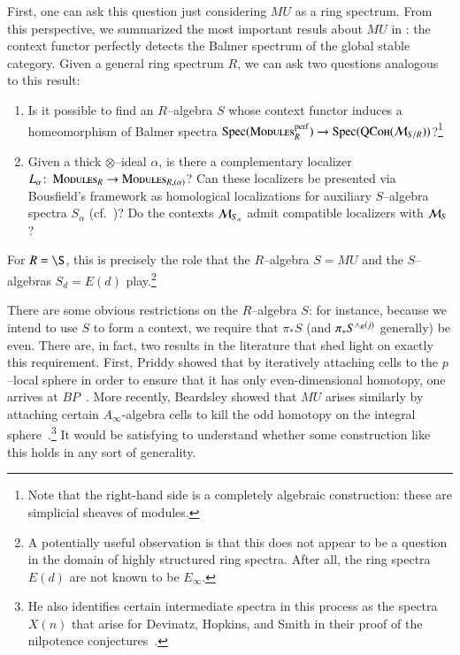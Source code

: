 First, one can ask this question just considering $MU$ as a ring spectrum.  From this perspective, we summarized the most important resuls about $MU$ in : the context functor perfectly detects the Balmer spectrum of the global stable category.  Given a general ring spectrum $R$, we can ask two questions analogous to this result:
\begin{enumerate}
\item Is it possible to find an $R$--algebra $S$ whose context functor induces a homeomorphism of Balmer spectra $\operatorname{Spec}(\normalfont\textsc{Modules}_R^{\mathrm{perf}}) \to \operatorname{Spec}(\normalfont\textsc{QCoh}(\mathcal{M}_{S/R}))$?\footnote{Note that the right-hand side is a completely algebraic construction: these are simplicial sheaves of modules.}
\item Given a thick $\otimes$--ideal $\alpha$, is there a complementary localizer $L_\alpha\colon\thinspace \normalfont\textsc{Modules}_R \to \normalfont\textsc{Modules}_{R,(\alpha)}$?  Can these localizers be presented via Bousfield's framework as homological localizations for auxiliary $S$--algebra spectra $S_\alpha$ (cf.\ )?  Do the contexts $\mathcal{M}_{S_\alpha}$ admit compatible localizers with $\mathcal{M}_{S}$?
\end{enumerate}
For $R = \S$, this is precisely the role that the $R$--algebra $S = MU$ and the $S$--algebras $S_d = E(d)$ play.\footnote{A potentially useful observation is that this does not appear to be a question in the domain of highly structured ring spectra.  After all, the ring spectra $E(d)$ are not known to be $E_\infty$.}

There are some obvious restrictions on the $R$--algebra $S$: for instance, because we intend to use $S$ to form a context, we require that $\pi_* S$ (and $\pi_* S^{\wedge_R (j)}$ generally) be even.  There are, in fact, two results in the literature that shed light on exactly this requirement.  First, Priddy showed that by iteratively attaching cells to the $p$--local sphere in order to ensure that it has only even-dimensional homotopy, one arrives at $BP$~\cite{Priddy}.  More recently, Beardsley showed that $MU$ arises similarly by attaching certain $A_\infty$-algebra cells to kill the odd homotopy on the integral sphere~\cite{Beardsley}.\footnote{He also identifies certain intermediate spectra in this process as the spectra $X(n)$ that arise for Devinatz, Hopkins, and Smith in their proof of the nilpotence conjectures~\cite{DHS}.}  It would be satisfying to understand whether some construction like this holds in any sort of generality.

